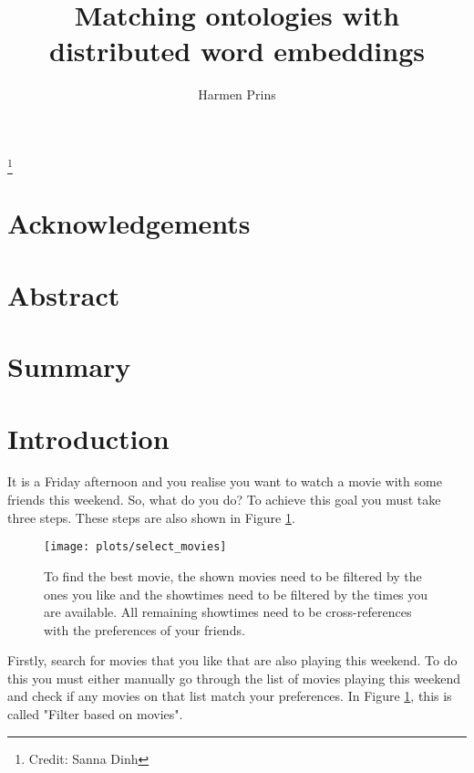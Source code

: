 \documentclass{article}
\title{Matching ontologies with distributed word embeddings}
\author{Harmen Prins}
\begin{document}
 \maketitle
 
 \footnote{Credit: Sanna Dinh}
 \newpage
 
 \section*{Acknowledgements}
 \section*{Abstract}  
 
 \section*{Summary}
 \tableofcontents
 \newpage
 
 
 \section{Introduction} \label{intro}
 It is a Friday afternoon and you realise you want to watch a movie with some friends this weekend. So, what do you do? To achieve this goal you must take three steps. These steps are also shown in Figure \ref{movies}.
  
 \begin{figure}[H]
 \centering
 \texttt{[image: plots/select\_movies]}
 \caption[Movie selection process]{To find the best movie, the shown movies need to be filtered by the ones you like and the showtimes need to be filtered by the times you are available. All remaining showtimes need to be cross-references with the preferences of your friends.}
 \label{movies}
 \end{figure}
 
 Firstly, search for movies that you like that are also playing this weekend. To do this you must either manually go through the list of movies playing this weekend and check if any movies on that list match your preferences. In Figure \ref{movies}, this is called "Filter based on movies".
 
\end{document}
